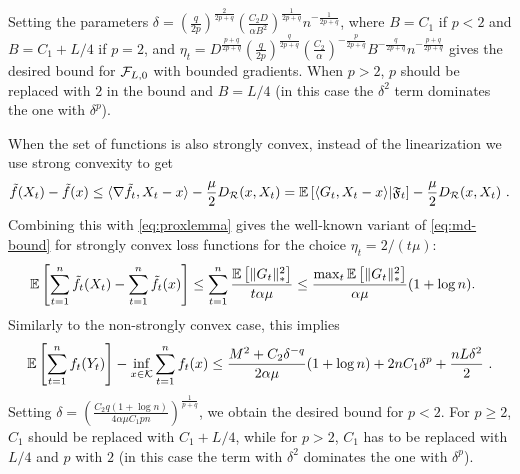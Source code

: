 Setting the parameters 
$\delta=(\frac{q}{2p})^{\frac{2}{2p+q}} (\frac{C_2 D}{\alpha B^2})^{\frac{1}{2p+q}} n^{-\frac{1}{2p+q}}$, 
where $B=C_1$ if $p<2$ and $B=C_1+L/4$ if $p=2$, and 
$\eta_t=D^{\frac{p+q}{2p+q}} (\frac{q}{2p})^{\frac{q}{2p+q}} (\frac{C_2}{\alpha})^{-\frac{p}{2p+q}} B^{-\frac{q}{2p+q}} n^{-\frac{p+q}{2p+q}}$ gives the desired bound for $\mathcal{F}_{L,0}$ with bounded gradients. When $p>2$, $p$ should be replaced with $2$ in the bound and $B=L/4$ (in this case the $\delta^2$ term dominates the one with $\delta^p$).


When the set of functions is also strongly convex, instead of the linearization we use strong convexity to get
\[
\tilde{f}(X_t) - \tilde{f}(x) \le \langle \nabla \tilde{f}_t,X_t-x \rangle - \frac{\mu}{2} D_{\mathcal{R}}(x,X_t) = \mathbb{E}\left[\langle  G_t,X_t-x \rangle| \mathfrak{F}_t\right] - \frac{\mu}{2} D_{\mathcal{R}}(x,X_t) ~.
\]
Combining this with \eqref{eq:proxlemma} gives the well-known variant of \eqref{eq:md-bound} for strongly convex loss functions \citep{BaHaRa07} for the choice $\eta_t=2/(t\mu)$:
\begin{align*}
\mathbb{E}\left[\sum_{t=1}^n \tilde{f}_t(X_t)- \sum_{t=1}^n \tilde{f}_t(x)\right] 
& \le \sum_{t=1}^n  \frac{\mathbb{E}\left[\|G_t\|_*^2\right]}{ t \alpha \mu} \le \frac{\max_t \mathbb{E}\left[\|G_t\|_*^2\right]}{\alpha \mu} (1+\log n).
\end{align*}
Similarly to the non-strongly convex case, this implies
\begin{align}
\mathbb{E}\left[\sum_{t=1}^n f_t(Y_t)\right] - \inf_{x \in \mathcal{K}} \sum_{t=1}^n f_t(x) \le 
\frac{M^2 + C_2 \delta^{-q}}{2 \alpha \mu} (1+\log n)+  2 n C_1 \delta^{p} + \frac{n L \delta^2}{2}~.
\end{align}
Setting $\delta=(\frac{C_2 q (1+\log n)}{4 \alpha \mu C_1 p n})^{\frac{1}{p+q}}$, we obtain the desired bound for $p<2$. For $p \ge 2$, $C_1$ should be replaced with $C_1+L/4$, while for $p>2$,  $C_1$ has to be replaced with $L/4$ and $p$ with $2$ (in this case the term with $\delta^2$ dominates the one with $\delta^p$).



